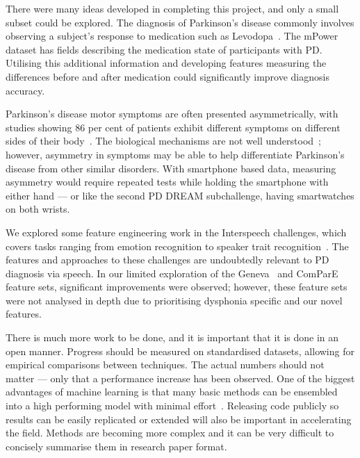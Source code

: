 \documentclass[12pt, twoside]{book}
\begin{document}
There were many ideas developed in completing this project, and only a small subset could be explored. The diagnosis of Parkinson's disease commonly involves observing a subject's response to medication such as Levodopa~\cite{tolosadiagnosis26}. The mPower dataset has fields describing the medication state of participants with PD. Utilising this additional information and developing features measuring the differences before and after medication could significantly improve diagnosis accuracy.

Parkinson's disease motor symptoms are often presented asymmetrically, with studies showing 86 per cent of patients exhibit different symptoms on different sides of their body~\cite{pdasymmetry}. The biological mechanisms are not well understood~\cite{djaldetti2006mystery}; however, asymmetry in symptoms may be able to help differentiate Parkinson's disease from other similar disorders. With smartphone based data, measuring asymmetry would require repeated tests while holding the smartphone with either hand --- or like the second PD DREAM subchallenge, having smartwatches on both wrists. 

We explored some feature engineering work in the Interspeech challenges, which covers tasks ranging from emotion recognition to speaker trait recognition~\cite{is2009}. The features and approaches to these challenges are undoubtedly relevant to PD diagnosis via speech. In our limited exploration of the Geneva~\cite{geneva} and ComParE~\cite{compareis13featureset} feature sets, significant improvements were observed; however, these feature sets were not analysed in depth due to prioritising dysphonia specific and our novel features.


There is much more work to be done, and it is important that it is done in an open manner. Progress should be measured on standardised datasets, allowing for empirical comparisons between techniques. The actual numbers should not matter --- only that a performance increase has been observed. One of the biggest advantages of machine learning is that many basic methods can be ensembled into a high performing model with minimal effort~\cite{netflixprizebellkor}. Releasing code publicly so results can be easily replicated or extended will also be important in accelerating the field. Methods are becoming more complex and it can be very difficult to concisely summarise them in research paper format.
\end{document}
